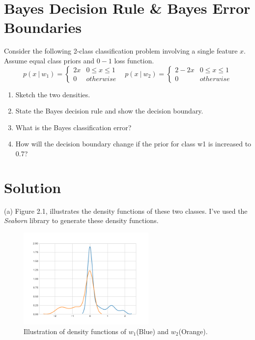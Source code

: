 \documentclass[12pt]{article}
\numberwithin{equation}{section}
\numberwithin{table}{section}
\numberwithin{figure}{section}
\begin{document}
\section{Bayes Decision Rule \& Bayes Error Boundaries}
Consider the following 2-class classification problem involving a single feature $x$. Assume equal class priors and $0-1$ loss function.
$$
p(x\ |\ w_1) = \begin{cases} 
2x &  0 \leq x \leq 1\\
0       &  otherwise
\end{cases} \ \ \ \ p(x\ |\ w_2) = \begin{cases} 
2-2x &  0 \leq x \leq 1\\
0       &  otherwise
\end{cases}
$$	
\begin{enumerate}[label=(\alph*)]
	\item Sketch the two densities.
	
	\item State the Bayes decision rule and show the decision boundary.
	
	\item What is the Bayes classification error?
	
	\item How will the decision boundary change if the prior for class w1 is increased to 0.7? 
\end{enumerate}
\section*{Solution}
(a) Figure 2.1, illustrates the density functions of these two classes. I've used the \textit{Seaborn} library to generate these density functions.
\begin{figure}[!h]\centering
	\includegraphics[width=0.6\textwidth]{2_1_1.png}
	\caption{Illustration of density functions of $w_1$(Blue) and $w_2$(Orange).}
	\label{density}
\end{figure}
\end{document}
